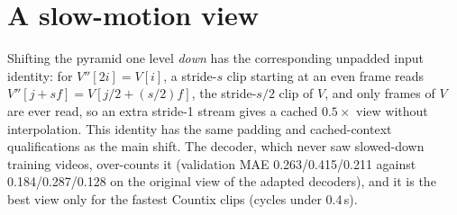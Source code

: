\begin{table}[h]
\centering
\caption{Development experiments (uncorrected training sets): test MAE of encoder
adaptation and of the language-model roles (mean over decoder seeds; number of
seeds in brackets). Rows 6--10 reweight the two views of the same five adapted
decoders as row 2.}
\label{tab:app_lm}
\small
\setlength{\tabcolsep}{3pt}
\end{table}

\section{A slow-motion view}
\label{app:slow}
Shifting the pyramid one level \emph{down} has the corresponding unpadded input
identity: for $V''[2i]=V[i]$, a
stride-$s$ clip starting at an even frame reads $V''[j+sf]=V[j/2+(s/2)f]$, the
stride-$s/2$ clip of $V$, and only frames of $V$ are ever read, so an extra
stride-1 stream gives a cached $0.5\times$ view without interpolation. This
identity has the same padding and cached-context qualifications as the main
shift. The decoder,
which never saw slowed-down training videos, over-counts it (validation MAE
0.263/0.415/0.211 against 0.184/0.287/0.128 on the original view of the adapted
decoders), and it is the best view only for the fastest Countix clips (cycles
under 0.4\,s).

